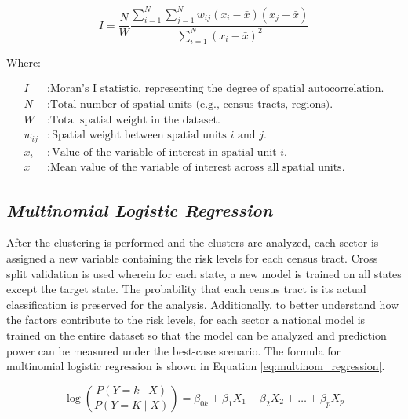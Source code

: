 \begin{equation}\label{eq:local_moran_i}
    I = \frac{N}{W} \frac{\sum_{i=1}^{N} \sum_{j=1}^{N} w_{ij} (x_i - \bar{x})(x_j - \bar{x})}{\sum_{i=1}^{N} (x_i - \bar{x})^2}
\end{equation}

Where:

\begin{align*}
I & : \text{Moran's I statistic, representing the degree of spatial autocorrelation.} \\
N & : \text{Total number of spatial units (e.g., census tracts, regions).} \\
W & : \text{Total spatial weight in the dataset.} \\
w_{ij} & : \text{Spatial weight between spatial units \(i\) and \(j\).} \\
x_i & : \text{Value of the variable of interest in spatial unit \(i\).} \\
\bar{x} & : \text{Mean value of the variable of interest across all spatial units.}
\end{align*}


\subsection{\textit{Multinomial Logistic Regression}}

After the clustering is performed and the clusters are analyzed, each sector is assigned a new variable containing the risk levels for each census tract. Cross split validation is used wherein for each state, a new model is trained on all states except the target state. The probability that each census tract is its actual classification is preserved for the analysis. Additionally, to better understand how the \hs factors contribute to the risk levels, for each sector a national model is trained on the entire dataset so that the model can be analyzed and prediction power can be measured under the best-case scenario. The formula for multinomial logistic regression is shown in Equation \ref{eq:multinom_regression}.

\begin{equation}\label{eq:multinom_regression}
    \log\left(\frac{{P(Y = k \mid X)}}{{P(Y = K \mid X)}}\right) = \beta_{0k} + \beta_1 X_1 + \beta_2 X_2 + \dots + \beta_p X_p
\end{equation}

